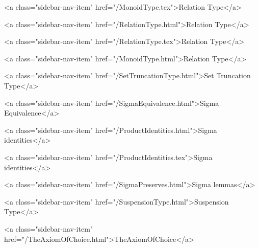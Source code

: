       
    
      
        
          <a class="sidebar-nav-item" href="/MonoidType.tex">Relation Type</a>
        
      
    
      
        
          <a class="sidebar-nav-item" href="/RelationType.html">Relation Type</a>
        
      
    
      
        
          <a class="sidebar-nav-item" href="/RelationType.tex">Relation Type</a>
        
      
    
      
        
          <a class="sidebar-nav-item" href="/MonoidType.html">Relation Type</a>
        
      
    
      
        
          <a class="sidebar-nav-item" href="/SetTruncationType.html">Set Truncation Type</a>
        
      
    
      
        
          <a class="sidebar-nav-item" href="/SigmaEquivalence.html">Sigma Equivalence</a>
        
      
    
      
        
          <a class="sidebar-nav-item" href="/ProductIdentities.html">Sigma identities</a>
        
      
    
      
        
          <a class="sidebar-nav-item" href="/ProductIdentities.tex">Sigma identities</a>
        
      
    
      
        
          <a class="sidebar-nav-item" href="/SigmaPreserves.html">Sigma lemmas</a>
        
      
    
      
        
          <a class="sidebar-nav-item" href="/SuspensionType.html">Suspension Type</a>
        
      
    
      
        
          <a class="sidebar-nav-item" href="/TheAxiomOfChoice.html">TheAxiomOfChoice</a>
        
